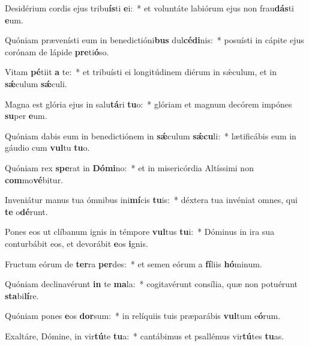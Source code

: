 \item Desidérium cordis ejus tribu\textbf{ís}ti \textbf{e}i:~* et voluntáte labiórum ejus non frau\textbf{dás}ti \textbf{e}um.
\item Quóniam prævenísti eum in benedictióni\textbf{bus} dul\textbf{cé}\textbf{di}nis:~* posuísti in cápite ejus corónam de lápide \textbf{pre}ti\textbf{ó}so.
\item Vitam \textbf{pé}tiit \textbf{a} te:~* et tribuísti ei longitúdinem diérum in sǽculum, et in \textbf{sǽ}culum \textbf{sǽ}culi.
\item Magna est glória ejus in salu\textbf{tá}ri \textbf{tu}o:~* glóriam et magnum decórem impónes \textbf{su}per \textbf{e}um.
\item Quóniam dabis eum in benedictiónem in \textbf{sǽ}culum \textbf{sǽ}\textbf{cu}li:~* lætificábis eum in gáudio cum \textbf{vul}tu \textbf{tu}o.
\item Quóniam rex \textbf{spe}rat in \textbf{Dó}\textbf{mi}no:~* et in misericórdia Altíssimi non \textbf{com}mo\textbf{vé}bitur.
\item Inveniátur manus tua ómnibus ini\textbf{mí}cis \textbf{tu}is:~* déxtera tua invéniat omnes, qui \textbf{te} o\textbf{dé}runt.
\item Pones eos ut clíbanum ignis in témpore \textbf{vul}tus \textbf{tu}i:~* Dóminus in ira sua conturbábit eos, et devorábit \textbf{e}os \textbf{i}gnis.
\item Fructum eórum de \textbf{ter}ra \textbf{per}des:~* et semen eórum a \textbf{fí}liis \textbf{hó}minum.
\item Quóniam declinavérunt \textbf{in} te \textbf{ma}la:~* cogitavérunt consília, quæ non potuérunt \textbf{sta}bi\textbf{lí}re.
\item Quóniam pones \textbf{e}os \textbf{dor}sum:~* in relíquiis tuis præparábis \textbf{vul}tum e\textbf{ó}rum.
\item Exaltáre, Dómine, in vir\textbf{tú}te \textbf{tu}a:~* cantábimus et psallémus vir\textbf{tú}tes \textbf{tu}as.
